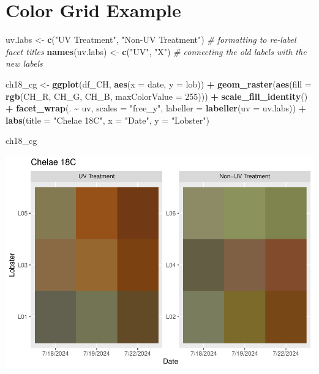 \documentclass[
]{article}
\newenvironment{Shaded}{\begin{snugshade}}{\end{snugshade}}
\newcommand{\AttributeTok}[1]{\textcolor[rgb]{0.13,0.29,0.53}{#1}}
\newcommand{\CommentTok}[1]{\textcolor[rgb]{0.56,0.35,0.01}{\textit{#1}}}
\newcommand{\DecValTok}[1]{\textcolor[rgb]{0.00,0.00,0.81}{#1}}
\newcommand{\FunctionTok}[1]{\textcolor[rgb]{0.13,0.29,0.53}{\textbf{#1}}}
\newcommand{\NormalTok}[1]{#1}
\newcommand{\OtherTok}[1]{\textcolor[rgb]{0.56,0.35,0.01}{#1}}
\newcommand{\SpecialCharTok}[1]{\textcolor[rgb]{0.81,0.36,0.00}{\textbf{#1}}}
\newcommand{\StringTok}[1]{\textcolor[rgb]{0.31,0.60,0.02}{#1}}
\begin{document}
\section{Color Grid Example}\label{color-grid-example}

\begin{Shaded}
\begin{Highlighting}[]
\NormalTok{uv.labs }\OtherTok{\textless{}{-}} \FunctionTok{c}\NormalTok{(}\StringTok{"UV Treatment"}\NormalTok{, }\StringTok{"Non{-}UV Treatment"}\NormalTok{) }\CommentTok{\# formatting to re{-}label facet titles}
\FunctionTok{names}\NormalTok{(uv.labs) }\OtherTok{\textless{}{-}} \FunctionTok{c}\NormalTok{(}\StringTok{"UV"}\NormalTok{, }\StringTok{"X"}\NormalTok{) }\CommentTok{\# connecting the old labels with the new labels}

\NormalTok{ch18\_cg }\OtherTok{\textless{}{-}} \FunctionTok{ggplot}\NormalTok{(df\_CH, }\FunctionTok{aes}\NormalTok{(}\AttributeTok{x =}\NormalTok{ date, }\AttributeTok{y =}\NormalTok{ lob)) }\SpecialCharTok{+}
  \FunctionTok{geom\_raster}\NormalTok{(}\FunctionTok{aes}\NormalTok{(}\AttributeTok{fill =} \FunctionTok{rgb}\NormalTok{(CH\_R, CH\_G, CH\_B, }\AttributeTok{maxColorValue =} \DecValTok{255}\NormalTok{))) }\SpecialCharTok{+}
  \FunctionTok{scale\_fill\_identity}\NormalTok{() }\SpecialCharTok{+}
  \FunctionTok{facet\_wrap}\NormalTok{(. }\SpecialCharTok{\textasciitilde{}}\NormalTok{ uv, }\AttributeTok{scales =} \StringTok{"free\_y"}\NormalTok{, }\AttributeTok{labeller =} \FunctionTok{labeller}\NormalTok{(}\AttributeTok{uv =}\NormalTok{ uv.labs)) }\SpecialCharTok{+}
  \FunctionTok{labs}\NormalTok{(}\AttributeTok{title =} \StringTok{"Chelae 18C"}\NormalTok{, }\AttributeTok{x =} \StringTok{"Date"}\NormalTok{, }\AttributeTok{y =} \StringTok{"Lobster"}\NormalTok{)}

\NormalTok{ch18\_cg}
\end{Highlighting}
\end{Shaded}

\includegraphics{color_analysis_pdf_files/figure-latex/Chelae_(CH)_Color Grid-1.pdf}
\end{document}
